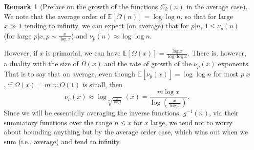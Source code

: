 \documentclass[11pt,reqno,a4letter]{article}
\numberwithin{figure}{section}
\numberwithin{table}{section}
\theoremstyle{plain}
\numberwithin{theorem}{section}
\theoremstyle{definition}
\newtheorem{remark}[theorem]{Remark}
\begin{document}
\begin{remark}[Preface on the growth of the functions $C_k(n)$ in the average case] 
\label{remark_PrefaceOnAvgOrderGrowthOfFuncCkn} 
We note that the average order of $\mathbb{E}[\Omega(n)] = \log\log n$, so that for large $x \gg 1$ tending to 
infinity, we can expect (on average) that for $p|n$, $1 \leq \nu_p(n)$ (for large $p|x, p \sim \frac{x}{\log x}$) 
and $\nu_p(n) \approx \log\log n$. 

However, if $x$ is primorial, we can have 
$\mathbb{E}[\Omega(x)] = \frac{\log x}{\log\log x}$. There is, however, a duality with the size of $\Omega(x)$ and the 
rate of growth of the $\nu_p(x)$ exponents. That is to say that on average, 
even though $\mathbb{E}[\nu_p(x)] = \log\log n$ for most $p|x$, if $\Omega(x) = m \approx O(1)$ is small, then 
\[
\nu_p(x) \approx \log_{\sqrt[m]{\frac{x}{\log x}}}(x) = \frac{m \log x}{\log\left(\frac{x}{\log x}\right)}. 
\]
Since we will be essentially averaging the inverse functions, $g^{-1}(n)$, via their summatory functions 
over the range $n \leq x$ for $x$ large, we tend not to worry about bounding anything but by the 
average order case, which wins out when we sum (i.e., average) and tend to infinity. 
\end{remark} 
\end{document}
